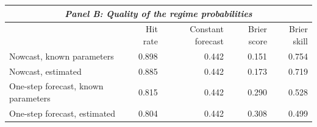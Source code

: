 \begin{tabular*}{\textwidth}{l@{\extracolsep{\fill}}rrrr}
\multicolumn{5}{c}{\textit{Panel B: Quality of the regime probabilities}} \\
\midrule
 & Hit rate & Constant forecast & Brier score & Brier skill \\
\midrule
Nowcast, known parameters & 0.898 & 0.442 & 0.151 & 0.754 \\
Nowcast, estimated & 0.885 & 0.442 & 0.173 & 0.719 \\
One-step forecast, known parameters & 0.815 & 0.442 & 0.290 & 0.528 \\
One-step forecast, estimated & 0.804 & 0.442 & 0.308 & 0.499 \\
\bottomrule
\end{tabular*}

